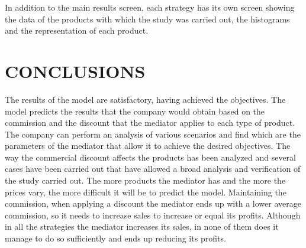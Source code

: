 \documentclass[review]{elsarticle}
\begin{document}
In addition to the main results screen, each strategy has its own screen showing the data of the products with which the study was carried out, the histograms and the representation of each product.

\section{CONCLUSIONS}

The results of the model are satisfactory, having achieved the objectives.
The model predicts the results that the company would obtain based on the commission and the discount that the mediator applies to each type of product. The company can perform an analysis of various scenarios and find which are the parameters of the mediator that allow it to achieve the desired objectives.
The way the commercial discount affects the products has been analyzed and several cases have been carried out that have allowed a broad analysis and verification of the study carried out.
The more products the mediator has and the more the prices vary, the more difficult it will be to predict the model. Maintaining the commission, when applying a discount the mediator ends up with a lower average commission, so it needs to increase sales to increase or equal its profits. Although in all the strategies the mediator increases its sales, in none of them does it manage to do so sufficiently and ends up reducing its profits.

\end{document}
